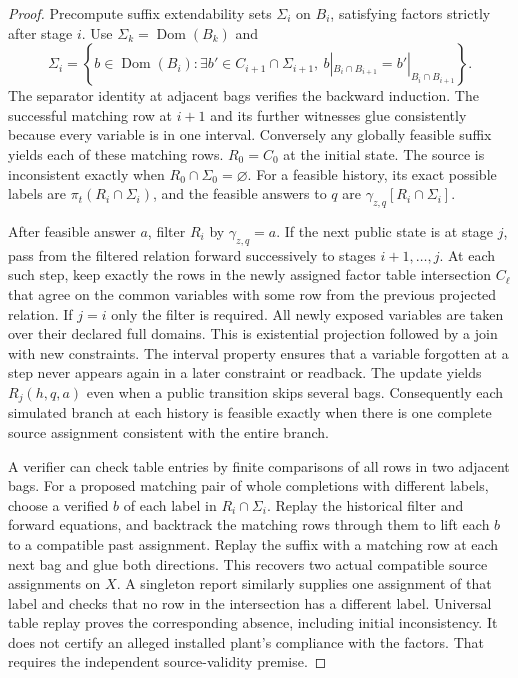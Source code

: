 \begin{proof}
Precompute suffix extendability sets \(\Sigma_i\) on \(B_i\), satisfying factors strictly after stage \(i\). Use \(\Sigma_k=\operatorname{Dom}(B_k)\) and
\[
 \Sigma_i = \left\{b\in\operatorname{Dom}(B_i):
       \exists b'\in C_{i+1}\cap\Sigma_{i+1},\
       b|_{B_i\cap B_{i+1}}=b'|_{B_i\cap B_{i+1}}\right\}.
\]
The separator identity at adjacent bags verifies the backward induction. The successful matching row at \(i+1\) and its further witnesses glue consistently because every variable is in one interval. Conversely any globally feasible suffix yields each of these matching rows. \(R_0=C_0\) at the initial state. The source is inconsistent exactly when \(R_0\cap\Sigma_0=\varnothing\). For a feasible history, its exact possible labels are \(\pi_t(R_i\cap\Sigma_i)\), and the feasible answers to \(q\) are \(\gamma_{z,q}[R_i\cap\Sigma_i]\).

After feasible answer \(a\), filter \(R_i\) by \(\gamma_{z,q}=a\). If the next public state is at stage \(j\), pass from the filtered relation forward successively to stages \(i+1,\dots,j\). At each such step, keep exactly the rows in the newly assigned factor table intersection \(C_\ell\) that agree on the common variables with some row from the previous projected relation. If \(j=i\) only the filter is required. All newly exposed variables are taken over their declared full domains. This is existential projection followed by a join with new constraints. The interval property ensures that a variable forgotten at a step never appears again in a later constraint or readback. The update yields \(R_j(h,q,a)\) even when a public transition skips several bags. Consequently each simulated branch at each history is feasible exactly when there is one complete source assignment consistent with the entire branch.

A verifier can check table entries by finite comparisons of all rows in two adjacent bags. For a proposed matching pair of whole completions with different labels, choose a verified \(b\) of each label in \(R_i\cap\Sigma_i\). Replay the historical filter and forward equations, and backtrack the matching rows through them to lift each \(b\) to a compatible past assignment. Replay the suffix with a matching row at each next bag and glue both directions. This recovers two actual compatible source assignments on \(X\). A singleton report similarly supplies one assignment of that label and checks that no row in the intersection has a different label. Universal table replay proves the corresponding absence, including initial inconsistency. It does not certify an alleged installed plant's compliance with the factors. That requires the independent source-validity premise.


\end{proof}
